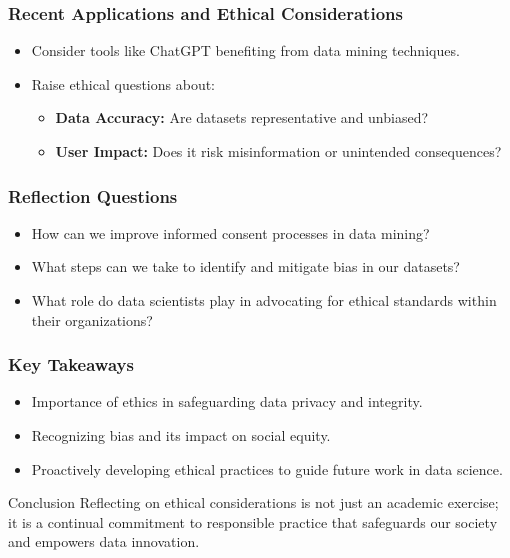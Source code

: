 \documentclass[aspectratio=169]{beamer}
\begin{document}
\begin{frame}[fragile]
    \frametitle{Recent Applications and Ethical Considerations}
    \begin{itemize}
        \item Consider tools like ChatGPT benefiting from data mining techniques.
        \item Raise ethical questions about:
            \begin{itemize}
                \item \textbf{Data Accuracy:} Are datasets representative and unbiased?
                \item \textbf{User Impact:} Does it risk misinformation or unintended consequences?
            \end{itemize}
    \end{itemize}
\end{frame}

\begin{frame}[fragile]
    \frametitle{Reflection Questions}
    \begin{itemize}
        \item How can we improve informed consent processes in data mining?
        \item What steps can we take to identify and mitigate bias in our datasets?
        \item What role do data scientists play in advocating for ethical standards within their organizations?
    \end{itemize}
\end{frame}

\begin{frame}[fragile]
    \frametitle{Key Takeaways}
    \begin{itemize}
        \item Importance of ethics in safeguarding data privacy and integrity.
        \item Recognizing bias and its impact on social equity.
        \item Proactively developing ethical practices to guide future work in data science.
    \end{itemize}
    
    \begin{block}{Conclusion}
        Reflecting on ethical considerations is not just an academic exercise; it is a continual commitment to responsible practice that safeguards our society and empowers data innovation.
    \end{block}
\end{frame}
\end{document}
